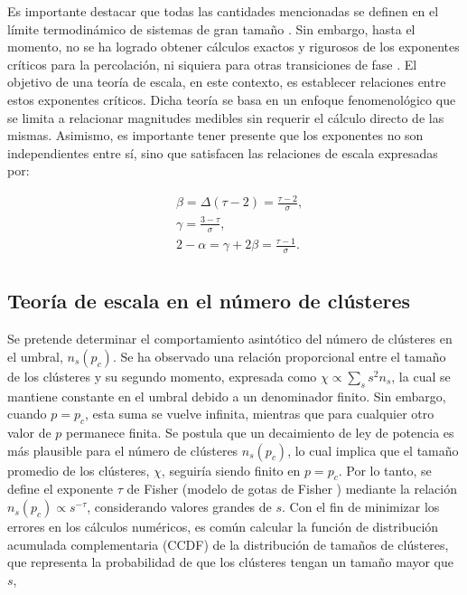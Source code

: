 	
Es importante destacar que todas las cantidades mencionadas se definen en el límite termodinámico de sistemas de gran tamaño \cite{bunde_fractals_2012}. Sin embargo, hasta el momento, no se ha logrado obtener cálculos exactos y rigurosos de los exponentes críticos para la percolación, ni siquiera para otras transiciones de fase \cite{stauffer_scaling_1979}. El objetivo de una teoría de escala, en este contexto, es establecer relaciones entre estos exponentes críticos. Dicha teoría se basa en un enfoque fenomenológico que se limita a relacionar magnitudes medibles sin requerir el cálculo directo de las mismas. Asimismo, es importante tener presente que los exponentes no son independientes entre sí, sino que satisfacen las relaciones de escala expresadas por:


 \begin{align}\label{eq:7}
 	&\beta = \Delta\left(\tau-2\right)=\frac{\tau-2}{\sigma},\\
 	&\gamma=\frac{3-\tau}{\sigma},\\
 	&2-\alpha= \gamma + 2\beta =\frac{\tau-1}{\sigma}.\\	
 	 \end{align}



\subsection{ Teoría de  escala en el número de clústeres }\label{sec:num_clusteres}


Se pretende determinar el comportamiento asintótico del número de clústeres en el umbral, $n_s(p_c)$.  Se ha observado una relación proporcional entre el tamaño de los clústeres y su segundo momento, expresada como  $\chi \propto \sum_s s^2n_s$,   la cual se mantiene constante en el umbral debido a un denominador finito.  
Sin embargo, cuando $p = p_c$, esta suma se vuelve infinita, mientras que para cualquier otro valor de $p$ permanece finita. Se postula que un decaimiento de ley de potencia es más plausible para el número de clústeres $n_s(p_c)$, lo cual implica que el tamaño promedio de los clústeres, $\chi$, seguiría siendo finito en $p = p_c$. Por lo tanto, se define el exponente $\tau$ de Fisher (modelo de gotas de Fisher \cite{fisher_theory_1967}) mediante la relación $n_s(p_c) \propto s^{-\tau}$, considerando valores grandes de $s$. Con el fin de minimizar los errores en los cálculos numéricos, es común calcular la función de distribución acumulada complementaria (CCDF) de la distribución de tamaños de clústeres, que representa la probabilidad de que los clústeres tengan un tamaño mayor que $s$,

